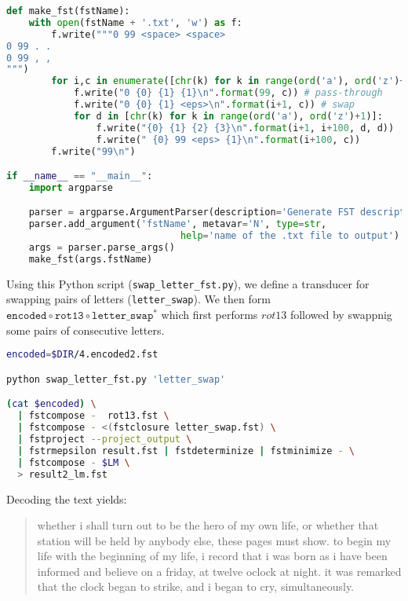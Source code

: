 \documentclass[a4paper,oneside,reqno]{amsart}
\begin{document}
\begin{enumerate}[label=\arabic*.]
\begin{enumerate}[label=(\alph*)]
\begin{lstlisting}[language=python]
def make_fst(fstName):
    with open(fstName + '.txt', 'w') as f:
        f.write("""0 99 <space> <space>
0 99 . .
0 99 , ,
""")
        for i,c in enumerate([chr(k) for k in range(ord('a'), ord('z')+1)]):
            f.write("0 {0} {1} {1}\n".format(99, c)) # pass-through
            f.write("0 {0} {1} <eps>\n".format(i+1, c)) # swap
            for d in [chr(k) for k in range(ord('a'), ord('z')+1)]:
                f.write("{0} {1} {2} {3}\n".format(i+1, i+100, d, d))
                f.write(" {0} 99 <eps> {1}\n".format(i+100, c))
        f.write("99\n")

if __name__ == "__main__":
    import argparse

    parser = argparse.ArgumentParser(description='Generate FST description for swapping letters')
    parser.add_argument('fstName', metavar='N', type=str,
                               help='name of the .txt file to output')
    args = parser.parse_args()
    make_fst(args.fstName)
    \end{lstlisting}

    Using this Python script (\texttt{swap\_letter\_fst.py}), we define a transducer
    for swapping pairs of letters (\texttt{letter\_swap}). We then form
    $\texttt{encoded} \circ \texttt{rot13} \circ \texttt{letter\_swap}^*$ which
    first performs $rot13$ followed by swappnig some pairs of consecutive letters.
    \begin{lstlisting}[language=bash]
encoded=$DIR/4.encoded2.fst

python swap_letter_fst.py 'letter_swap'

(cat $encoded) \
  | fstcompose -  rot13.fst \
  | fstcompose - <(fstclosure letter_swap.fst) \
  | fstproject --project_output \
  | fstrmepsilon result.fst | fstdeterminize | fstminimize - \
  | fstcompose - $LM \
  > result2_lm.fst
    \end{lstlisting}
    Decoding the text yields:
    \begin{quote} %
      whether i shall turn out to be the hero of my own life, or whether that station
      will be held by anybody else, these pages must show. to begin my life
      with the beginning of my life, i record that i was born as i have been
      informed and believe on a friday, at twelve oclock at night. it was
      remarked that the clock began to strike, and i began to cry,
      simultaneously.
    \end{quote}
  \end{enumerate}
\end{enumerate}

%
%


\end{document}

